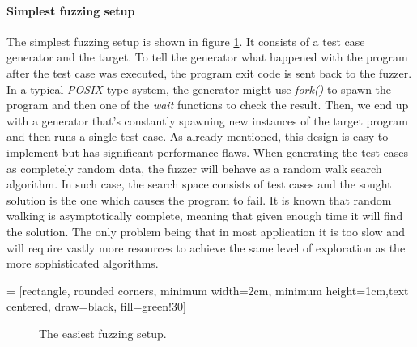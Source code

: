 \paragraph{Simplest fuzzing setup}
The simplest fuzzing setup is shown in figure \ref{fig:simp_fuzz}. It consists of a test case generator and the target. To tell the generator what happened with the program after the test case was executed, the program exit code is sent back to the fuzzer. In a typical \textit{POSIX} type system, the generator might use \textit{fork()} to spawn the program and then one of the \textit{wait} functions to check the result. Then, we end up with a generator that's constantly spawning new instances of the target program and then runs a single test case. As already mentioned, this design is easy to implement but has significant performance flaws. When generating the test cases as completely random data, the fuzzer will behave as a random walk search algorithm. In such case, the search space consists of test cases and the sought solution is the one which causes the program to fail. It is known that random walking is asymptotically complete, meaning that given enough time it will find the solution. The only problem being that in most application it is too slow and will require vastly more resources to achieve the same level of exploration as the more sophisticated algorithms.

 = [rectangle, rounded corners, minimum width=2cm, minimum height=1cm,text centered, draw=black, fill=green!30]

\begin{figure}[h!]
    \centering


    \caption{The easiest fuzzing setup.}
    \label{fig:simp_fuzz}
\end{figure}

